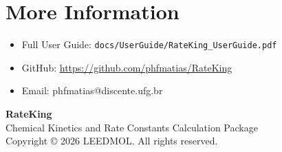 \documentclass[11pt,a4paper]{article}
\begin{document}
\section{More Information}

\begin{itemize}
    \item Full User Guide: \texttt{docs/UserGuide/RateKing\_UserGuide.pdf}
    \item GitHub: \url{https://github.com/phfmatias/RateKing}
    \item Email: phfmatias@discente.ufg.br
\end{itemize}

\vfill

\begin{center}
\textbf{RateKing} \\
Chemical Kinetics and Rate Constants Calculation Package \\
Copyright © 2026 LEEDMOL. All rights reserved.
\end{center}
\end{document}
